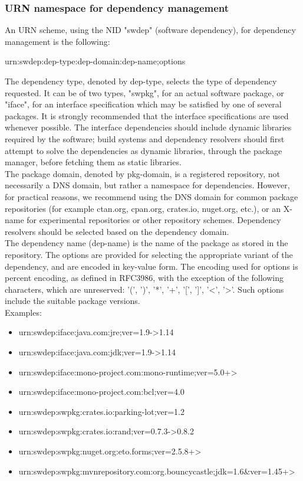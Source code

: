 \subsubsection{URN namespace for dependency management}
An URN scheme, using the NID "swdep" (software dependency), for dependency management is the following:
\begin{center}
	urn:swdep:dep-type:dep-domain:dep-name;options
\end{center}
The dependency type, denoted by dep-type, selects the type of dependency requested. It can be of two types, "swpkg", for an actual software package, or "iface", for an interface specification which may be satisfied by one of several packages. It is strongly recommended that the interface specifications are used whenever possible. The interface dependencies should include dynamic libraries required by the software; build systems and dependency resolvers should first attempt to solve the dependencies as dynamic libraries, through the package manager, before fetching them as static libraries.\\
The package domain, denoted by pkg-domain, is a registered repository, not necessarily a DNS domain, but rather a namespace for dependencies. However, for practical reasons, we recommend using the DNS domain for common package repositories (for example ctan.org, cpan.org, crates.io, nuget.org, etc.), or an X-name for experimental repositories or other repository schemes. Dependency resolvers should be selected based on the dependency domain.\\
The dependency name (dep-name) is the name of the package as stored in the repository. The options are provided for selecting the appropriate variant of the dependency, and are encoded in key-value form. The encoding used for options is percent encoding, as defined in RFC3986, with the exception of the following characters, which are unreserved: '(', ')', '*', '+', '[', ']', '<', '>'. Such options include the suitable package versions.\\
Examples:
\begin{itemize}
	\item urn:swdep:iface:java.com:jre;ver=1.9->1.14
	\item urn:swdep:iface:java.com:jdk;ver=1.9->1.14
	\item urn:swdep:iface:mono-project.com:mono-runtime;ver=5.0+>
	\item urn:swdep:iface:mono-project.com:bcl;ver=4.0
	\item urn:swdep:swpkg:crates.io:parking-lot;ver=1.2
	\item urn:swdep:swpkg:crates.io:rand;ver=0.7.3->0.8.2
	\item urn:swdep:swpkg:nuget.org:eto.forms;ver=2.5.8+>
	\item urn:swdep:swpkg:mvnrepository.com:org.bouncycastle;jdk=1.6\&ver=1.45+>
\end{itemize}

